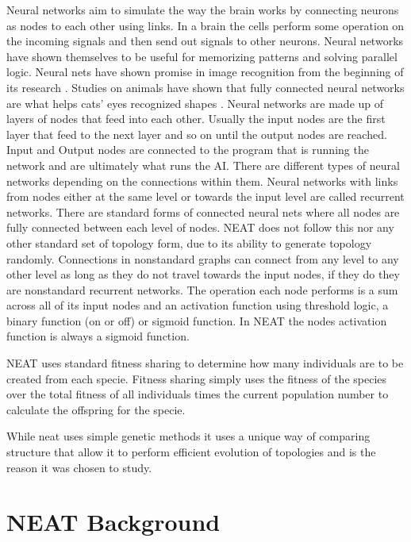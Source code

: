 \documentclass[12pt]{ucthesis} \newif\ifpdf \ifx\pdfoutput\undefined
\begin{document}
Neural networks aim to simulate the way the brain works by connecting neurons as
nodes to each other using links. In a brain the cells perform some operation on
the incoming signals and then send out signals to other neurons.
Neural networks have shown themselves to be useful for memorizing patterns and
solving parallel logic. Neural nets have shown promise in image recognition from
the beginning of its research \cite{lippmann}. Studies on animals have shown
that fully connected neural networks are what helps cats’ eyes recognized shapes
\cite{hubel1959receptive}.
Neural networks are made up of layers of nodes that feed into each other.
Usually the input nodes are the first layer that feed to the next layer and so
on until the output nodes are reached. Input and Output nodes are connected to
the program that is running the network and are ultimately what runs the AI.
There are different types of neural networks depending on the connections within
them. Neural networks with links from nodes either at the same level or towards
the input level are called recurrent networks. There are standard forms of
connected neural nets where all nodes are fully connected between each level of
nodes. NEAT does not follow this nor any other standard set of topology form,
due to its ability to generate topology randomly. Connections in nonstandard
graphs can connect from any level to any other level as long as they do not
travel towards the input nodes, if they do they are nonstandard recurrent
networks.
The operation each node performs is a sum across all of its input nodes and an
activation function using threshold logic, a binary function (on or off) or
sigmoid function. In NEAT the nodes activation function is always a sigmoid
function.

NEAT uses standard fitness sharing to determine how many individuals are to be
created from each specie. Fitness sharing simply uses the fitness of the species
over the total fitness of all individuals times the current population number to
calculate the offspring for the specie.

While neat uses simple genetic methods it uses a unique way of comparing
structure that allow it to perform efficient evolution of topologies and is the
reason it was chosen to study.

\section{NEAT Background}
\end{document}
